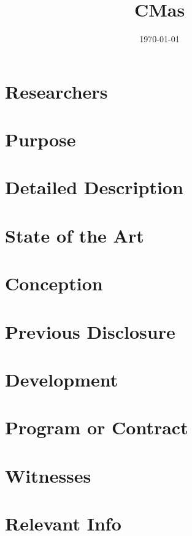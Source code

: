 \documentclass{article}
\title{
CMas
}
\date{\today}
\begin{document}
\maketitle

\section*{Researchers}

\section*{Purpose}

\section*{Detailed Description}

\section*{State of the Art}

\section*{Conception}

\section*{Previous Disclosure}

\section*{Development}

\section*{Program or Contract}

\section*{Witnesses}

\section*{Relevant Info}
\end{document}

